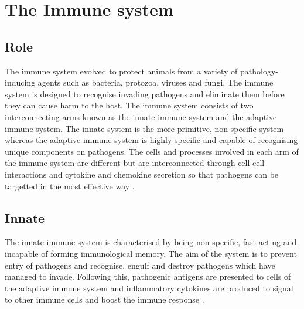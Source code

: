 





\section{The Immune system}
\subsection{Role}

The immune system evolved to protect animals from a variety of pathology-inducing agents such as bacteria, protozoa, viruses and fungi.
The immune system is designed to recognise invading pathogens and eliminate them before they can cause harm to the host.
The immune system consists of two interconnecting arms known as the innate immune system and the adaptive immune system.
The innate system is the more primitive, non specific system whereas the adaptive immune system is highly specific and capable of recognising unique components on pathogens.
The cells and processes involved in each arm of the immune system are different but are interconnected through cell-cell interactions and cytokine and chemokine secretion so that pathogens can be targetted in the most effective way \citep{KubyImmunology, Janeway2001, Parkin2001}.

\subsection{Innate}

The innate immune system is characterised by being non specific, fast acting and incapable of forming immunological memory.
The aim of the system is to prevent entry of pathogens and recognise, engulf and destroy pathogens which have managed to invade.
Following this, pathogenic antigens are presented to cells of the adaptive immune system and inflammatory cytokines are produced to signal to other immune cells and boost the immune response \citep{Janeway2001}.

